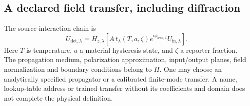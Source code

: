 \subsection{A declared field transfer, including diffraction}

The source interaction chain is
\begin{equation}
 U_{\mathrm{det},\lambda}
 =H_{z,\lambda}\!\left[
 A\,t_\lambda(T,a,\zeta)
 e^{i\phi_{\mathrm{lens},\lambda}}U_{\mathrm{in},\lambda}\right].
 \label{eq:want-field-transfer}
\end{equation}
Here $T$ is temperature, $a$ a material hysteresis state, and $\zeta$ a reporter
fraction. The propagation medium, polarization approximation, input/output
planes, field normalization and boundary conditions belong to $H$. One may
choose an analytically specified propagator or a calibrated finite-mode
transfer. A name, lookup-table address or trained transfer without its
coefficients and domain does not complete the physical definition.

